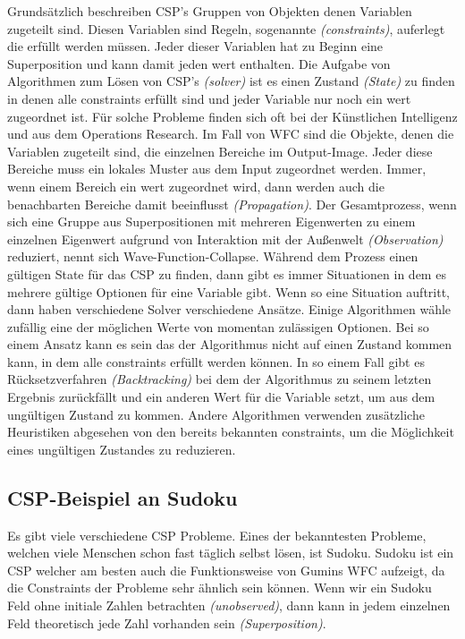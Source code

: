 \documentclass[12pt, a4paper,twoside,openright]{report}
\begin{document}
Grundsätzlich beschreiben CSP's Gruppen von Objekten denen Variablen zugeteilt sind.
Diesen Variablen sind Regeln, sogenannte \textit{(constraints)}, auferlegt die erfüllt werden müssen.
Jeder dieser Variablen hat zu Beginn eine Superposition und kann damit jeden wert enthalten.
Die Aufgabe von Algorithmen zum Lösen von CSP's \textit{(solver)} ist es einen Zustand \textit{(State)} zu finden in denen alle constraints erfüllt sind und jeder Variable nur noch ein wert zugeordnet ist.
Für solche Probleme finden sich oft bei der Künstlichen Intelligenz und aus dem Operations Research. \cite{Lecoutre2009ConstraintNT}
Im Fall von WFC sind die Objekte, denen die Variablen zugeteilt sind, die einzelnen Bereiche im Output-Image.
Jeder diese Bereiche muss ein lokales Muster aus dem Input zugeordnet werden.
Immer, wenn einem Bereich ein wert zugeordnet wird, dann werden auch die benachbarten Bereiche damit beeinflusst \textit{(Propagation)}.
Der Gesamtprozess, wenn sich eine Gruppe aus Superpositionen mit mehreren Eigenwerten zu einem einzelnen Eigenwert aufgrund von Interaktion mit der Außenwelt \textit{(Observation)} reduziert,
nennt sich Wave-Function-Collapse. \cite{Zinkernagel_2016}
Während dem Prozess einen gültigen State für das CSP zu finden, dann gibt es immer Situationen in dem es mehrere gültige Optionen für eine Variable gibt.
Wenn so eine Situation auftritt, dann haben verschiedene Solver verschiedene Ansätze.
Einige Algorithmen wähle zufällig eine der möglichen Werte von momentan zulässigen Optionen.
Bei so einem Ansatz kann es sein das der Algorithmus nicht auf einen Zustand kommen kann, in dem alle constraints erfüllt werden können.
In so einem Fall gibt es Rücksetzverfahren \textit{(Backtracking)} bei dem der Algorithmus zu seinem letzten Ergebnis zurückfällt und ein anderen Wert für die Variable setzt, um aus dem
ungültigen Zustand zu kommen.
Andere Algorithmen verwenden zusätzliche Heuristiken abgesehen von den bereits bekannten constraints, um die Möglichkeit eines ungültigen Zustandes zu reduzieren. \cite{Karth2017WaveFunctionCollapseIC}

\subsection{CSP-Beispiel an Sudoku}

Es gibt viele verschiedene CSP Probleme.
Eines der bekanntesten Probleme, welchen viele Menschen schon fast täglich selbst lösen, ist Sudoku.
Sudoku ist ein CSP welcher am besten auch die Funktionsweise von Gumins WFC aufzeigt, da die Constraints der Probleme sehr ähnlich sein können.
\newline
Wenn wir ein Sudoku Feld ohne initiale Zahlen betrachten \textit{(unobserved)}, dann kann in jedem einzelnen Feld theoretisch jede Zahl vorhanden sein \textit{(Superposition)}.
\end{document}
